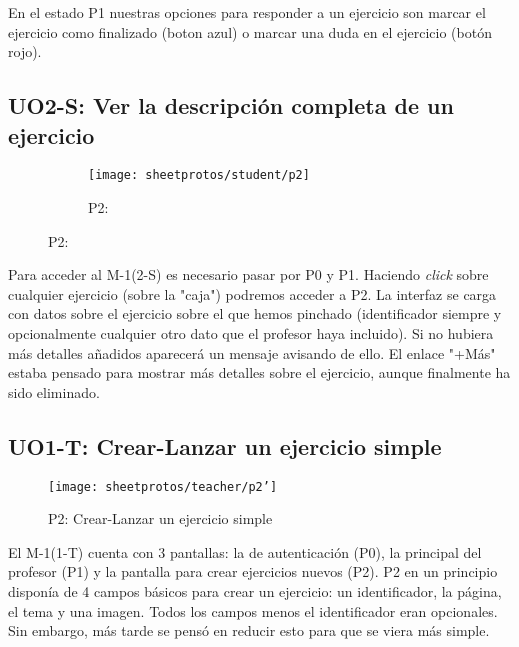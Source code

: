 En el estado P1 nuestras opciones para responder a un ejercicio son marcar el ejercicio como finalizado (boton azul) o marcar una duda en el ejercicio (botón rojo).\\

\subsection{UO2-S: Ver la descripción completa de un ejercicio}
\label{analisis-de-requisitos:funcionales:uo2s}

\begin{figure}[H]
\begin{subfigure}[b]{0.5\textwidth}
	\centering
	\texttt{[image: sheetprotos/student/p2]}
	\caption{P2: }
	\label{fig:files-css}
\end{subfigure}


\label{fig:uo2s}
\end{figure}

Para acceder al M-1(2-S) es necesario pasar por P0 y P1. Haciendo \textit{click} sobre cualquier ejercicio (sobre la "caja") podremos acceder a P2. La interfaz se carga con datos sobre el ejercicio sobre el que hemos pinchado (identificador siempre y opcionalmente cualquier otro dato que el profesor haya incluido). Si no hubiera más detalles añadidos aparecerá un mensaje avisando de ello. El enlace "+Más" estaba pensado para mostrar más detalles sobre el ejercicio, aunque finalmente ha sido eliminado.\\

\subsection{UO1-T: Crear-Lanzar un ejercicio simple}
\label{analisis-de-requisitos:funcionales:uo1t}

\begin{figure}[H]
	\centering
	\texttt{[image: sheetprotos/teacher/p2']}
	\caption{P2: Crear-Lanzar un ejercicio simple}
	\label{fig:p2-viejo}
\end{figure}

El M-1(1-T) cuenta con 3 pantallas: la de autenticación (P0), la principal del profesor (P1) y la pantalla para crear ejercicios nuevos (P2). P2 en un principio disponía  de 4 campos básicos para crear un ejercicio: un identificador, la página, el tema y una imagen. Todos los campos menos el identificador eran opcionales. Sin embargo, más tarde se pensó en reducir esto para que se viera más simple.\\

